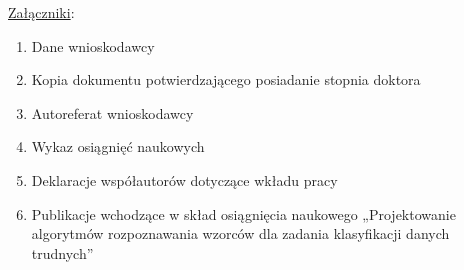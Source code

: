 \begin{fullwidth}
\begin{minipage}{50em}
\end{minipage}

\newpage
\thispagestyle{empty}

\underline{Załączniki}:
\begin{enumerate}
	\item Dane wnioskodawcy
	\item Kopia dokumentu potwierdzającego posiadanie stopnia doktora
	\item Autoreferat wnioskodawcy
	\item Wykaz osiągnięć naukowych
	\item Deklaracje współautorów dotyczące wkładu pracy
	\item Publikacje wchodzące w skład osiągnięcia naukowego „Projektowanie algorytmów rozpoznawania wzorców dla zadania klasyfikacji danych trudnych”
\end{enumerate}

\end{fullwidth}

